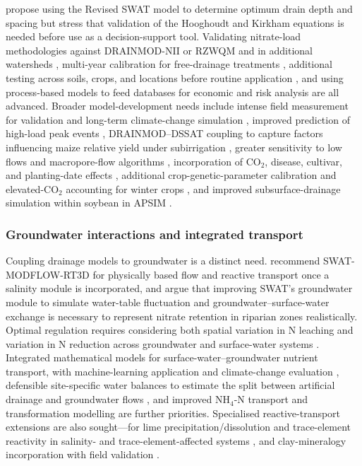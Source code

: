 \textcite{Moriasi2013} propose using the Revised SWAT model to determine optimum drain depth and spacing but stress that validation of the Hooghoudt and Kirkham equations is needed before use as a decision-support tool. Validating nitrate-load methodologies against DRAINMOD-NII or RZWQM and in additional watersheds \parencite{Ale2012}, multi-year calibration for free-drainage treatments \parencite{Ng2000}, additional testing across soils, crops, and locations before routine application \parencite{Skaggs1995}, and using process-based models to feed databases for economic and risk analysis \parencite{Malone2007} are all advanced. Broader model-development needs include intense field measurement for validation and long-term climate-change simulation \parencite{Negm2014}, improved prediction of high-load peak events \parencite{Grewal2025}, DRAINMOD--DSSAT coupling to capture factors influencing maize relative yield under subirrigation \parencite{Gunn2018}, greater sensitivity to low flows and macropore-flow algorithms \parencite{Morrison2014}, incorporation of CO$_2$, disease, cultivar, and planting-date effects \parencite{Ndulue2024}, additional crop-genetic-parameter calibration and elevated-CO$_2$ accounting for winter crops \parencite{Li2025}, and improved subsurface-drainage simulation within soybean in APSIM \parencite{Dietzel2016}.

\subsubsection{Groundwater interactions and integrated transport}

Coupling drainage models to groundwater is a distinct need. \textcite{Addab2022} recommend SWAT-MODFLOW-RT3D for physically based flow and reactive transport once a salinity module is incorporated, and \textcite{Hoang2017} argue that improving SWAT's groundwater module to simulate water-table fluctuation and groundwater--surface-water exchange is necessary to represent nitrate retention in riparian zones realistically. Optimal regulation requires considering both spatial variation in N leaching and variation in N reduction across groundwater and surface-water systems \parencite{Hojberg2017}. Integrated mathematical models for surface-water--groundwater nutrient transport, with machine-learning application and climate-change evaluation \parencite{Elsayed2023}, defensible site-specific water balances to estimate the split between artificial drainage and groundwater flows \parencite{Barkle2021}, and improved NH$_4$-N transport and transformation modelling \parencite{Yang2008} are further priorities. Specialised reactive-transport extensions are also sought---for lime precipitation/dissolution and trace-element reactivity in salinity- and trace-element-affected systems \parencite{KARAJEH1994c}, and clay-mineralogy incorporation with field validation \parencite{Dadfar2010}.

